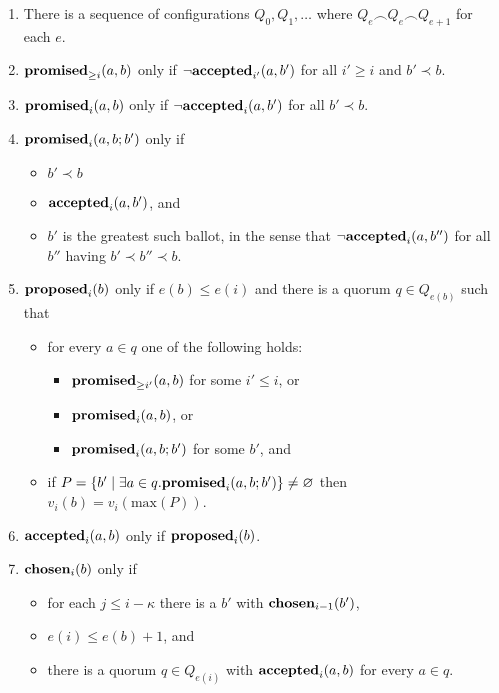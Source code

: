 \documentclass[journal]{IEEEtran}
\begin{document}
\begin{enumerate}

\item\label{paxos-quorums} There is a sequence of configurations $Q_0, Q_1,
\ldots$ where ${Q_e \frown Q_e \frown Q_{e+1}}$ for each $e$.

\item\label{paxos-mprom} $\mathbf{promised}_{\ge i}(a,b)$ only if $\neg\mathbf{accepted}_{i'}(a,b')$ for
all $i' \ge i$ and $b' \prec b$.

\item\label{paxos-fprom} $\mathbf{promised}_{i}(a,b)$ only if $\neg\mathbf{accepted}_{i}(a,b')$ for all
$b' \prec b$.

\item\label{paxos-bprom} $\mathbf{promised}_{i}(a,b;b')$ only if \begin{itemize} \item
$b' \prec b$ \item $\mathbf{accepted}_{i}(a,b')$, and \item $b'$ is the greatest such
ballot, in the sense that $\neg \mathbf{accepted}_{i}(a,b'')$ for all $b''$ having $b'
\prec b'' \prec b$. \end{itemize}

\item\label{paxos-prop} $\mathbf{proposed}_{i}(b)$ only if $e(b) \le e(i)$ and there is a
quorum $q \in Q_{e(b)}$ such that
\begin{itemize}
\item for every $a \in q$ one of the following holds:
%
\begin{itemize}
\item $\mathbf{promised}_{\ge i'}(a,b)$ for some $i' \le i$, or
\item $\mathbf{promised}_{i}(a,b)$, or
\item $\mathbf{promised}_{i}(a,b;b')$ for some $b'$, and
\end{itemize}

\item if $P = \{ b' \mid \exists a \in q. \mathbf{promised}_{i}(a,b;b') \} \ne
\varnothing$ then $v_i(b) = v_i(\mathrm{max}(P))$.

\end{itemize}

\item \label{paxos-acc} $\mathbf{accepted}_{i}(a,b)$ only if $\mathbf{proposed}_{i}(b)$.

\item \label{paxos-chosen} $\mathbf{chosen}_{i}(b)$ only if \begin{itemize} \item for
each $j \le i - \kappa$ there is a $b'$ with $\mathbf{chosen}_{i-1}(b')$, \item $e(i)
\le e(b) + 1$, and \item there is a quorum $q \in Q_{e(i)}$ with
$\mathbf{accepted}_{i}(a,b)$ for every $a \in q$.  \end{itemize}

\end{enumerate}
\end{document}
